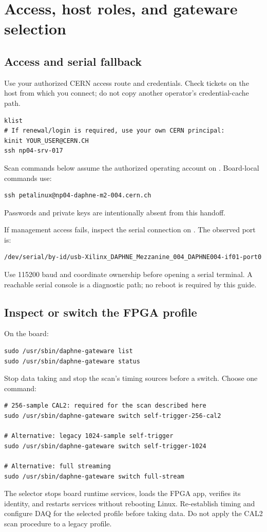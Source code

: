 \documentclass[10pt,a4paper]{article}
\newcommand{\code}[1]{\texttt{\detokenize{#1}}}
\begin{document}
\section{Access, host roles, and gateware selection}
\subsection{Access and serial fallback}
Use your authorized CERN access route and credentials. Check tickets on the host from which you connect; do not copy another operator's credential-cache path.
\begin{lstlisting}
klist
# If renewal/login is required, use your own CERN principal:
kinit YOUR_USER@CERN.CH
ssh np04-srv-017
\end{lstlisting}
Scan commands below assume the authorized \code{np04daq} operating account on \code{np04-srv-017}. Board-local commands use:
\begin{lstlisting}
ssh petalinux@np04-daphne-m2-004.cern.ch
\end{lstlisting}
Passwords and private keys are intentionally absent from this handoff.

If management access fails, inspect the serial connection on \code{np04-onl-004}. The observed port is:
\begin{lstlisting}
/dev/serial/by-id/usb-Xilinx_DAPHNE_Mezzanine_004_DAPHNE004-if01-port0
\end{lstlisting}
Use 115200 baud and coordinate ownership before opening a serial terminal. A reachable serial console is a diagnostic path; no reboot is required by this guide.

\subsection{Inspect or switch the FPGA profile}
On the board:
\begin{lstlisting}
sudo /usr/sbin/daphne-gateware list
sudo /usr/sbin/daphne-gateware status
\end{lstlisting}
Stop data taking and stop the scan's timing sources before a switch. Choose one command:
\begin{lstlisting}
# 256-sample CAL2: required for the scan described here
sudo /usr/sbin/daphne-gateware switch self-trigger-256-cal2

# Alternative: legacy 1024-sample self-trigger
sudo /usr/sbin/daphne-gateware switch self-trigger-1024

# Alternative: full streaming
sudo /usr/sbin/daphne-gateware switch full-stream
\end{lstlisting}
The selector stops board runtime services, loads the FPGA app, verifies its identity, and restarts services without rebooting Linux. Re-establish timing and configure DAQ for the selected profile before taking data. Do not apply the CAL2 scan procedure to a legacy profile.
\end{document}
